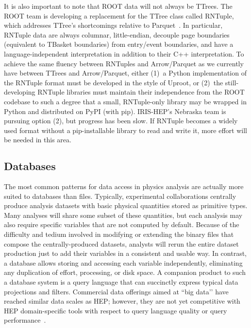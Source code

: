 \documentclass[12pt,a4paper]{article}
\begin{document}
It is also important to note that ROOT data will not always be TTrees. The ROOT team is developing a replacement for the TTree class called RNTuple, which addresses TTree's shortcomings relative to Parquet~\cite{Blomer:2020usr}. In particular, RNTuple data are always columnar, little-endian, decouple page boundaries (equivalent to TBasket boundaries) from entry/event boundaries, and have a language-independent interpretation in addition to their C++ interpretation. To achieve the same fluency between RNTuples and Arrow/Parquet as we currently have between TTrees and Arrow/Parquet, either (1)~a Python implementation of the RNTuple format must be developed in the style of Uproot, or (2)~the still-developing RNTuple libraries must maintain their independence from the ROOT codebase to such a degree that a small, RNTuple-only library may be wrapped in Python and distributed on PyPI (with pip). IRIS-HEP's Nebraska team is pursuing option (2), but progress has been slow. If RNTuple becomes a widely used format without a pip-installable library to read and write it, more effort will be needed in this area.

\subsection{Databases}

The most common patterns for data access in physics analysis are actually more suited to databases than files. Typically, experimental collaborations centrally produce analysis datasets with basic physical quantities stored as primitive types. Many analyses will share some subset of these quantities, but each analysis may also require specific variables that are not computed by default. Because of the difficulty and tedium involved in modifying or extending the binary files that compose the centrally-produced datasets, analysts will rerun the entire dataset production just to add their variables in a consistent and usable way. In contrast, a database allows storing and accessing each variable independently, eliminating any duplication of effort, processing, or disk space. A companion product to such a database system is a query language that can succinctly express typical data projections and filters. Commercial data offerings aimed at ``big data’’ have reached similar data scales as HEP; however, they are not yet competitive with HEP domain-specific tools with respect to query language quality or query performance~\cite{Graur:2021isi}.
\end{document}
